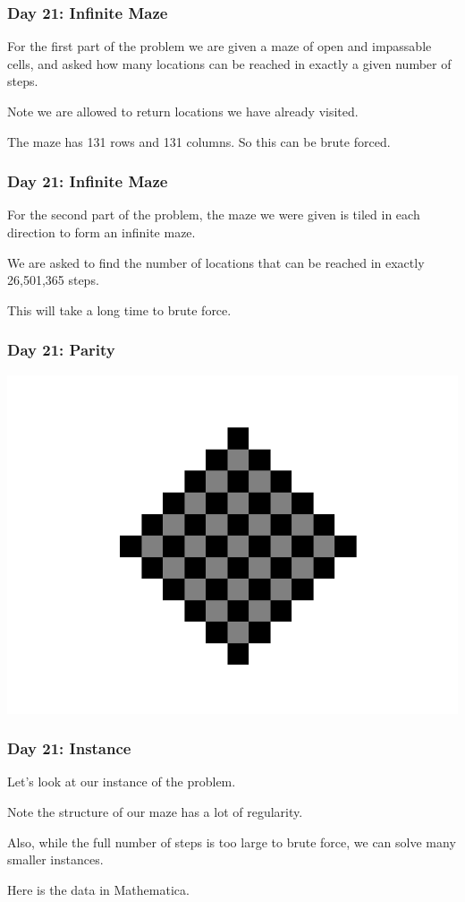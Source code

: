 \begin{frame}
\frametitle{Day 21: Infinite Maze}

For the first part of the problem we are given a maze of open and
impassable cells, and asked how many locations can be reached in exactly
a given number of steps.\vfill

Note we are allowed to return locations we have already visited.\vfill

The maze has 131 rows and 131 columns. So this can be brute forced.
\end{frame}

\begin{frame}
\frametitle{Day 21: Infinite Maze}

For the second part of the problem, the maze we were given is tiled in each direction to form
an infinite maze. \vfill

We are asked to find the number of locations that can be reached in exactly 26,501,365 steps.\vfill

This will take a long time to brute force.

\end{frame}

\begin{frame}
\frametitle{Day 21: Parity}

\includegraphics[width=\textwidth]{parity.png}

\end{frame}

\begin{frame}
\frametitle{Day 21: Instance}

Let's look at our instance of the problem. \vfill

Note the structure of our maze has a lot of regularity.\vfill

Also, while the full number of steps is too large to brute force,
we can solve many smaller instances.\vfill

Here is the data in Mathematica.
\end{frame}
